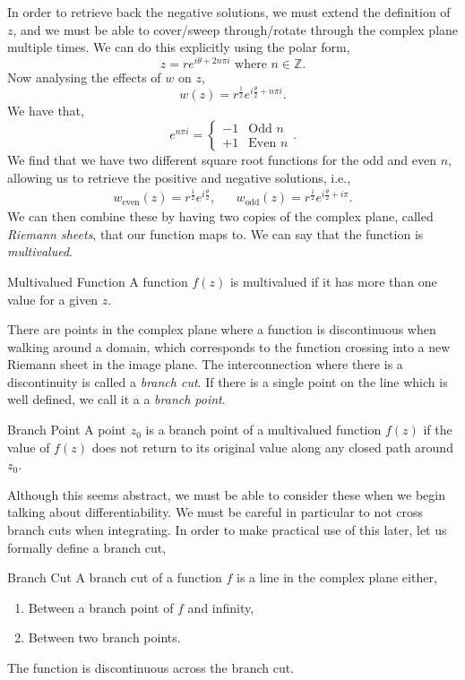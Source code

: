 \documentclass{book}
\begin{document}
In order to retrieve back the negative solutions, we must extend the definition of $z$, and we must be able to cover/sweep through/rotate through the complex plane multiple times. We can do this explicitly using the polar form, 
\begin{equation}
	z = re^{i\theta+2n\pi i } \text{ where } n \in \mathbb{Z}.
\end{equation}
Now analysing the effects of $w$ on $z$,
\begin{equation}
	w(z) = r^{\frac{1}{2}}e^{i\frac{\theta}{2}+n\pi i }.
\end{equation}
We have that,
\begin{equation}
	e^{n\pi i} = \begin{cases}
		-1 & \text{Odd }n \\
		+1 & \text{Even }n
	\end{cases}.
\end{equation}
We find that we have two different square root functions for the odd and even $n$, allowing us to retrieve the positive and negative solutions, i.e.,
\begin{align}
	w_{\text{even}}(z) = r^{\frac{1}{2}}e^{i\frac{\theta}{2}}, && w_{\text{odd}}(z) = r^{\frac{1}{2}}e^{i\frac{\theta}{2}+i\pi}.
\end{align} We can then combine these by having two copies of the complex plane, called \textit{Riemann sheets}, that our function maps to. We can say that the function is \textit{multivalued}.
\begin{Definitions}{Multivalued Function}{}
	A function $f(z)$ is multivalued if it has more than one value for a given $z$.
\end{Definitions}
There are points in the complex plane where a function is discontinuous when walking around a domain, which corresponds to the function crossing into a new Riemann sheet in the image plane. The interconnection where there is a discontinuity is called a \textit{branch cut}. If there is a single point on the line which is well defined, we call it a a \textit{branch point}.
\begin{Definitions}{Branch Point}{}
	A point $z_0$ is a branch point of a multivalued function $f(z)$ if the value of $f(z)$ does not return to its original value along any closed path around $z_0$. 
\end{Definitions}
Although this seems abstract, we must be able to consider these when we begin talking about differentiability. We must be careful in particular to not cross branch cuts when integrating. In order to make practical use of this later, let us formally define a branch cut,
\begin{Definitions}{Branch Cut}{}
	A branch cut of a function $f$ is a line in the complex plane either,
	\begin{enumerate}
		\item Between a branch point of $f$ and infinity,
		\item Between two branch points.
	\end{enumerate}
	The function is discontinuous across the branch cut.
\end{Definitions}
\end{document}
